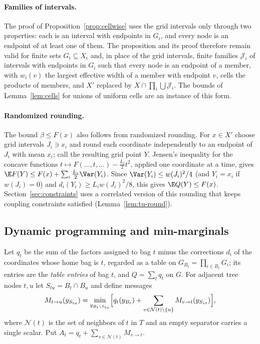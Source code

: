 \paragraph{Families of intervals.}
The proof of Proposition~\ref{prop:cellwise} uses the grid intervals only
through two properties: each is an interval with endpoints in $G_i$, and
every node is an endpoint of at least one of them. The proposition and its
proof therefore remain valid for finite sets $G_i\subseteq X_i$ and, in place of the grid
intervals, finite families $\mathcal J_i$ of intervals with endpoints in
$G_i$ such that every node is an endpoint of a member, with $w_i(v)$ the
largest effective width of a member with endpoint $v$, cells the products of
members, and $X'$ replaced by $X\cap\prod_i\bigcup\mathcal J_i$. The
bounds of Lemma~\ref{lem:cells} for unions of uniform cells are an instance
of this form.

\paragraph{Randomized rounding.}
The bound $\beta\le F(x)$ also follows from randomized rounding. For
$x\in X'$ choose grid intervals $J_i\ni x_i$ and round each coordinate
independently to an endpoint of $J_i$ with mean $x_i$; call the resulting
grid point $Y$. Jensen's inequality for the concave functions
$t\mapsto F(\dots,t,\dots)-\frac{L_i}2t^2$, applied one coordinate at a time,
gives $\E F(Y)\le F(x)+\sum_i\frac{L_i}2\Var(Y_i)$. Since
$\Var(Y_i)\le w(J_i)^2/4$ (and $Y_i=x_i$ if $w(J_i)=0$) and
$d_i(Y_i)\ge L_iw(J_i)^2/8$, this gives $\E Q(Y)\le F(x)$.
Section~\ref{sec:constraints} uses a correlated version of this rounding that
keeps coupling constraints satisfied (Lemma~\ref{lem:tu-round}).

\subsection{Dynamic programming and min-marginals}\label{sec:grids-dp}
Let $q_t$ be the sum of the factors assigned to bag $t$ minus the corrections
$d_i$ of the coordinates whose home bag is $t$, regarded as a table on
$G_{B_t}=\prod_{i\in B_t}G_i$; its entries are the \emph{table entries} of bag
$t$, and $Q=\sum_tq_t$ on $G$. For adjacent tree nodes $t,u$ let
$S_{tu}=B_t\cap B_u$ and define messages
\begin{equation}\label{eq:messages}
M_{t\to u}(y_{S_{tu}})=\min_{y_{B_t\setminus S_{tu}}}\Bigl[q_t(y_{B_t})
+\sum_{v\in\mathcal N(t)\setminus\{u\}}M_{v\to t}(y_{S_{vt}})\Bigr],
\end{equation}
where $\mathcal N(t)$ is the set of neighbors of $t$ in $T$ and an empty
separator carries a single scalar. Put
$A_t=q_t+\sum_{v\in\mathcal N(t)}M_{v\to t}$.

